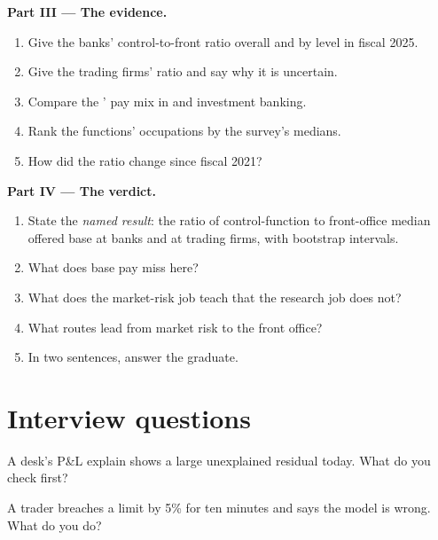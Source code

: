 \begin{problem}
\medskip\noindent\textbf{Part III --- The evidence.}
\begin{enumerate}[resume]
\item Give the banks' control-to-front ratio overall and by level in fiscal 2025.
\item Give the trading firms' ratio and say why it is uncertain.
\item Compare the ' pay mix in  and investment banking.
\item Rank the functions' occupations by the survey's medians.
\item How did the ratio change since fiscal 2021?
\end{enumerate}

\medskip\noindent\textbf{Part IV --- The verdict.}
\begin{enumerate}[resume]
\item State the \emph{named result}: the ratio of control-function to front-office median offered base at banks and at
trading firms, with bootstrap intervals.
\item What does base pay miss here?
\item What does the market-risk job teach that the research job does not?
\item What routes lead from market risk to the front office?
\item In two sentences, answer the graduate.
\end{enumerate}
\end{problem}

\section{Interview questions}

\begin{interviewq}\label{iq:in:risk-operations-product-control-and-compliance:1}
A desk's P\&L explain shows a large unexplained residual today. What do you check first?
\end{interviewq}

\begin{interviewq}\label{iq:in:risk-operations-product-control-and-compliance:2}
A trader breaches a limit by 5\% for ten minutes and says the model is wrong. What do you do?
\end{interviewq}

